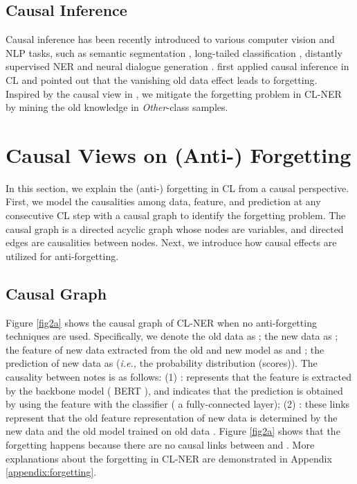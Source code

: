 \documentclass[11pt]{article}
\begin{document}
\subsection{Causal Inference}
Causal inference \citep{glymour2016causal,scholkopf2022causality} has been recently introduced to various computer vision and NLP tasks, such as semantic segmentation \citep{zhang2020causal}, long-tailed classification \citep{tang2020long,nan2021uncovering}, distantly supervised NER \citep{zhang2021biasing} and neural dialogue generation \citep{zhu2020counterfactual}.
\citet{hu2021distilling} first applied causal inference in CL and pointed out that the vanishing old data effect leads to forgetting.
Inspired by the causal view in \citep{hu2021distilling}, we mitigate the forgetting problem in CL-NER by mining the old knowledge in \textit{Other}-class samples.

\section{Causal Views on (Anti-) Forgetting}
In this section, we explain the (anti-) forgetting in CL from a causal perspective.
First, we model the causalities among data, feature, and prediction at any consecutive CL step with a causal graph \citep{pearl2009causality} to identify the forgetting problem.
The causal graph is a directed acyclic graph whose nodes are variables, and directed edges are causalities between nodes.
Next, we introduce how causal effects are utilized for anti-forgetting.

\subsection{Causal Graph}
Figure \ref{fig2a} shows the causal graph of CL-NER when no anti-forgetting techniques are used.
Specifically, we denote the old data as ; the new data as ; the feature of new data extracted from the old and new model as  and ; the prediction of new data as  (\textit{i.e.,} the probability distribution (scores)).
The causality between notes is as follows:
(1) :  represents that the feature  is extracted by the backbone model ( BERT \citep{devlin-etal-2019-bert}), and  indicates that the prediction  is obtained by using the feature  with the classifier ( a fully-connected layer);
(2) : these links represent that the old feature representation of new data  is determined by the new data  and the old model trained on old data .
Figure \ref{fig2a} shows that the forgetting happens because there are no causal links between  and .
More explanations about the forgetting in CL-NER are demonstrated in Appendix \ref{appendix:forgetting}.
\end{document}
